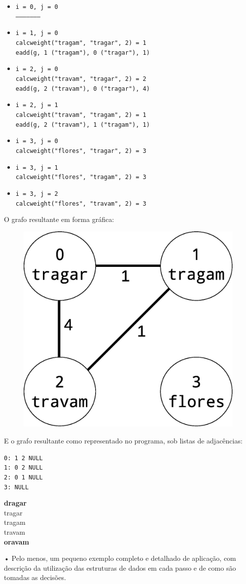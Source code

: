 \documentclass[a4paper, 18pt]{article}
\begin{document}
	\begin{itemize}
		\item
			\texttt{i = 0, j = 0} \\
			\texttt{---------------------}
		\item
			\texttt{i = 1, j = 0} \\
			\texttt{calc\textunderscore weight("tragam", "tragar", 2) = 1} \\
			\texttt{e\textunderscore add(g, 1 ("tragam"), 0 ("tragar"), 1)}
		\item
			\texttt{i = 2, j = 0} \\
			\texttt{calc\textunderscore weight("travam", "tragar", 2) = 2} \\
			\texttt{e\textunderscore add(g, 2 ("travam"), 0 ("tragar"), 4)}
		\item
			\texttt{i = 2, j = 1} \\
			\texttt{calc\textunderscore weight("travam", "tragam", 2) = 1} \\
			\texttt{e\textunderscore add(g, 2 ("travam"), 1 ("tragam"), 1)}
		\item
			\texttt{i = 3, j = 0} \\
			\texttt{calc\textunderscore weight("flores", "tragar", 2) = 3}
		\item
			\texttt{i = 3, j = 1} \\
			\texttt{calc\textunderscore weight("flores", "tragam", 2) = 3}
		\item
			\texttt{i = 3, j = 2} \\
			\texttt{calc\textunderscore weight("flores", "travam", 2) = 3}
	\end{itemize}
	\par
	O grafo resultante em forma gráfica:
	\begin{figure}[h]
		\includegraphics[width=0.5\linewidth]{graph}
	\end{figure}
	\par
	E o grafo resultante como representado no programa, sob listas de adjacências: \\
	\begin{center}
		\texttt{0: 1 \textrightarrow{} 2 \textrightarrow{} NULL \\
				1: 0 \textrightarrow{} 2 \textrightarrow{} NULL \\
				2: 0 \textrightarrow{} 1 \textrightarrow{} NULL \\
				3: \textrightarrow{} NULL}
	\end{center}

		\textbf{dragar} \\
		tragar \\
		tragam \\
		travam \\
		\textbf{oravam}


• Pelo menos, um pequeno exemplo completo e detalhado de aplicação, com descrição
da utilização das estruturas de dados em cada passo e de como são tomadas as
decisões.
\end{document}
